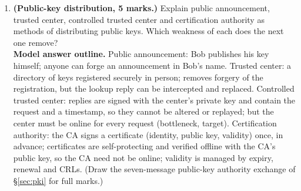 \begin{enumerate}[leftmargin=1.6em,itemsep=4pt]
  \item \textbf{(Public-key distribution, 5 marks.)} Explain public announcement, trusted center, controlled trusted center and certification authority as methods of distributing public keys. Which weakness of each does the next one remove?\\
  \textbf{Model answer outline.} Public announcement: Bob publishes his key himself; anyone can forge an announcement in Bob's name. Trusted center: a directory of keys registered securely in person; removes forgery of the registration, but the lookup reply can be intercepted and replaced. Controlled trusted center: replies are signed with the center's private key and contain the request and a timestamp, so they cannot be altered or replayed; but the center must be online for every request (bottleneck, target). Certification authority: the CA signs a certificate (identity, public key, validity) once, in advance; certificates are self-protecting and verified offline with the CA's public key, so the CA need not be online; validity is managed by expiry, renewal and CRLs. (Draw the seven-message public-key authority exchange of \S\ref{sec:pki} for full marks.)
\end{enumerate}
